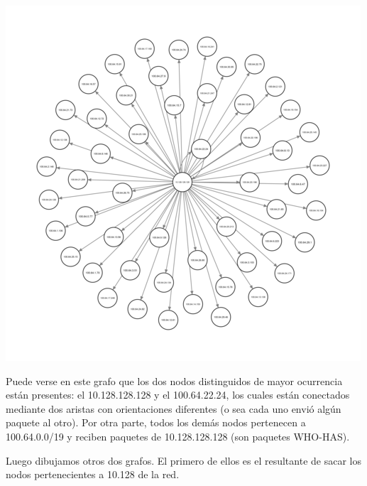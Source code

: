 \begin{center}
\includegraphics[scale=0.6]{../img/biblio-grafo-redesAB.png}
\end{center}

Puede verse en este grafo que los dos nodos distinguidos de mayor
ocurrencia están presentes: el 10.128.128.128 y el 100.64.22.24, los
cuales están conectados mediante dos aristas con orientaciones
diferentes (o sea cada uno envió algún paquete al otro). Por otra
parte, todos los demás nodos pertenecen a 100.64.0.0/19 y reciben
paquetes de 10.128.128.128 (son paquetes WHO-HAS).

Luego dibujamos otros dos grafos. El primero de ellos es el
resultante de sacar los nodos pertenecientes a 10.128 de la
red.


